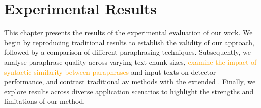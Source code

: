 \chapter{Experimental Results}
\label{chap:experimental_results}

This chapter presents the results of the experimental evaluation of our work. 
We begin by reproducing traditional results to establish the validity of our approach, followed by a comparison of different paraphrasing techniques. 
Subsequently, we analyse paraphrase quality across varying text chunk sizes, \textcolor{orange}{examine the impact of syntactic similarity between paraphrases} and input texts on detector performance, and contrast traditional \ac{av} methods with the extended \impAppr{}. 
Finally, we explore results across diverse application scenarios to highlight the strengths and limitations of our method. 












